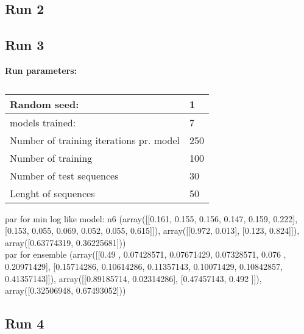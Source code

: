 



\subsection{Run 2}


\subsection{Run 3}

\textbf{Run parameters:} \\
\begin{table}[]
    \begin{tabular}{@{}ll@{}}
        \toprule
        Random seed:                            & 1   \\ \midrule
        models trained:                         & 7   \\
        Number of training iterations pr. model & 250 \\
        Number of training                      & 100 \\
        Number of test sequences                & 30 \\
        Lenght of sequences                     & 50  \\ \bottomrule
    \end{tabular}
    \caption{}
    \label{tab:my-table}
\end{table}

par for min log like model: n6
(array([[0.161, 0.155, 0.156, 0.147, 0.159, 0.222],
        [0.153, 0.055, 0.069, 0.052, 0.055, 0.615]]),
 array([[0.972, 0.013],
        [0.123, 0.824]]),
 array([0.63774319, 0.36225681]))\\

par for ensemble
(array([[0.49      , 0.07428571, 0.07671429, 0.07328571, 0.076     ,
         0.20971429],
        [0.15714286, 0.10614286, 0.11357143, 0.10071429, 0.10842857,
         0.41357143]]),
 array([[0.89185714, 0.02314286],
        [0.47457143, 0.492     ]]),
 array([0.32506948, 0.67493052]))


\subsection{Run 4}

